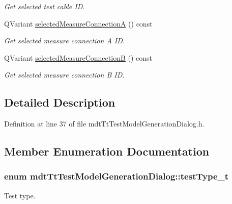 \begin{DoxyCompactItemize}
\begin{DoxyCompactList}\small\item\em Get selected test cable I\-D. \end{DoxyCompactList}\item 
Q\-Variant \hyperlink{classmdt_tt_test_model_generation_dialog_ac260b213d3e4a4b3750ed97c2324a78a}{selected\-Measure\-Connection\-A} () const 
\begin{DoxyCompactList}\small\item\em Get selected measure connection A I\-D. \end{DoxyCompactList}\item 
Q\-Variant \hyperlink{classmdt_tt_test_model_generation_dialog_a8feafc167ed75afc38ff7c5160e2f559}{selected\-Measure\-Connection\-B} () const 
\begin{DoxyCompactList}\small\item\em Get selected measure connection B I\-D. \end{DoxyCompactList}\end{DoxyCompactItemize}


\subsection{Detailed Description}


Definition at line 37 of file mdt\-Tt\-Test\-Model\-Generation\-Dialog.\-h.



\subsection{Member Enumeration Documentation}
\hypertarget{classmdt_tt_test_model_generation_dialog_a833486450bf0b6414015ab3b8e8432da}{
\subsubsection[{test\-Type\-\_\-t}]{\setlength{\rightskip}{0pt plus 5cm}enum {\bf mdt\-Tt\-Test\-Model\-Generation\-Dialog\-::test\-Type\-\_\-t}}}\label{classmdt_tt_test_model_generation_dialog_a833486450bf0b6414015ab3b8e8432da}


Test type. 

